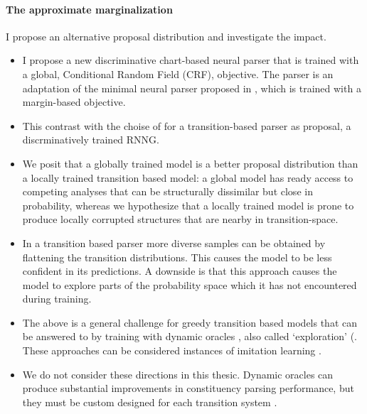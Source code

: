 \paragraph{The approximate marginalization} I propose an alternative proposal distribution and investigate the impact.
\begin{itemize}
  \item I propose a new discriminative chart-based neural parser that is trained with a global, Conditional Random Field (CRF), objective. The parser is an adaptation of the minimal neural parser proposed in \citet{stern2017minimal}, which is trained with a margin-based objective.
  \item This contrast with the choise of \citet{dyer2016rnng} for a transition-based parser as proposal, a discrminatively trained RNNG.
  \item We posit that a globally trained model is a better proposal distribution than a locally trained transition based model: a global model has ready access to competing analyses that can be structurally dissimilar but close in probability, whereas we hypothesize that a locally trained model is prone to produce locally corrupted structures that are nearby in transition-space.
  \item In a transition based parser more diverse samples can be obtained by flattening the transition distributions. This causes the model to be less confident in its predictions. A downside is that this approach causes the model to explore parts of the probability space which it has not encountered during training.
  \item The above is a general challenge for greedy transition based models that can be answered to by training with dynamic oracles \citep{goldberg2013dynamic}, also called `exploration' (\citep{ballesteros2016exploration,stern2017minimal}. These approaches can be considered instances of imitation learning \citep{vlachos2012imitation,he2012imitation}.
  \item We do not consider these directions in this thesic. Dynamic oracles can produce substantial improvements in constituency parsing performance, but they must be custom designed for each transition system \citep{klein2018reinforce}.
\end{itemize}


